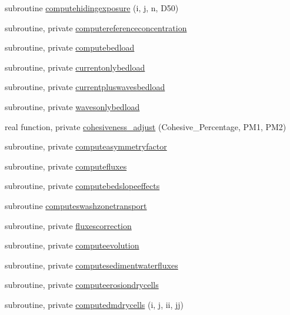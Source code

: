 \begin{DoxyCompactItemize}
\item 
subroutine \mbox{\hyperlink{namespacemodulesediment_a03f094fcbc01dd75c60a5a69ce5dde19}{computehidingexposure}} (i, j, n, D50)
\item 
subroutine, private \mbox{\hyperlink{namespacemodulesediment_ab4eb31a619673958de47a8eb42ca39fa}{computereferenceconcentration}}
\item 
subroutine, private \mbox{\hyperlink{namespacemodulesediment_a621ed127ad378409a67e67c54993d3cb}{computebedload}}
\item 
subroutine, private \mbox{\hyperlink{namespacemodulesediment_a099f230f690695fa4061449e8880d0e7}{currentonlybedload}}
\item 
subroutine, private \mbox{\hyperlink{namespacemodulesediment_ab4e81d1c3c2244f9bb0f378491adbc1e}{currentpluswavesbedload}}
\item 
subroutine, private \mbox{\hyperlink{namespacemodulesediment_ab75ac0182e2b11a8063dbb8027fa8d19}{wavesonlybedload}}
\item 
real function, private \mbox{\hyperlink{namespacemodulesediment_afbd767a170502bf18b5849039940895d}{cohesiveness\+\_\+adjust}} (Cohesive\+\_\+\+Percentage, P\+M1, P\+M2)
\item 
subroutine, private \mbox{\hyperlink{namespacemodulesediment_a7f0383935c0a22b77c959d32f6fa82e5}{computeasymmetryfactor}}
\item 
subroutine, private \mbox{\hyperlink{namespacemodulesediment_a1e2e55857d3719dbc4a034eb10281e6c}{computefluxes}}
\item 
subroutine, private \mbox{\hyperlink{namespacemodulesediment_ab31a25d99dffd49784478e26814bbea5}{computebedslopeeffects}}
\item 
subroutine \mbox{\hyperlink{namespacemodulesediment_a0fc734d1e2e7bacc8606e169d198ead5}{computeswashzonetransport}}
\item 
subroutine, private \mbox{\hyperlink{namespacemodulesediment_a982ebf7fcffb2f4bd698f8ec31fea0d1}{fluxescorrection}}
\item 
subroutine, private \mbox{\hyperlink{namespacemodulesediment_aba93d4f48399841f747d4c862880f365}{computeevolution}}
\item 
subroutine, private \mbox{\hyperlink{namespacemodulesediment_aef98ab4e43c91c6528368e12b3bc5199}{computesedimentwaterfluxes}}
\item 
subroutine, private \mbox{\hyperlink{namespacemodulesediment_a8f039d145535e96ceb83a4518f8f82a6}{computeerosiondrycells}}
\item 
subroutine, private \mbox{\hyperlink{namespacemodulesediment_a299a31086ad8f844252db856c26e1ce7}{computedmdrycells}} (i, j, ii, jj)

\end{DoxyCompactItemize}
